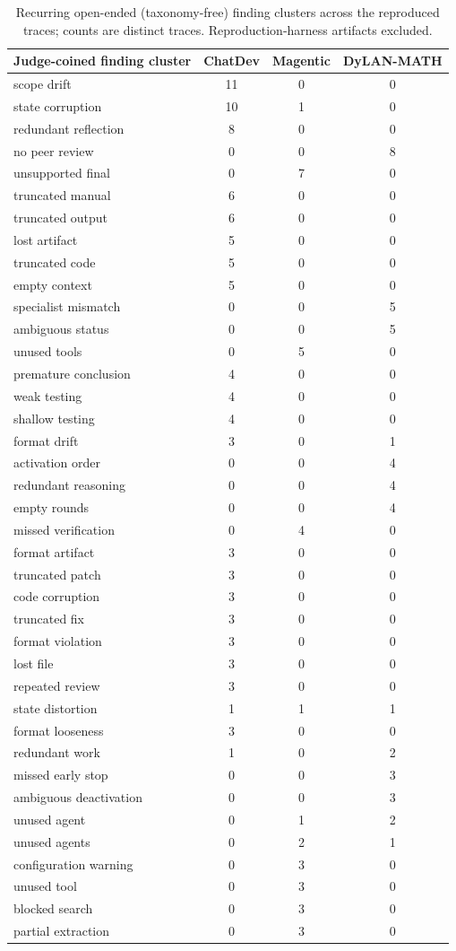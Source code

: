 \begin{table}[h]\centering\small
\begin{tabular}{lccc}\toprule
Judge-coined finding cluster & ChatDev & Magentic & DyLAN-MATH\\
\midrule
scope drift & 11 & 0 & 0\\
state corruption & 10 & 1 & 0\\
redundant reflection & 8 & 0 & 0\\
no peer review & 0 & 0 & 8\\
unsupported final & 0 & 7 & 0\\
truncated manual & 6 & 0 & 0\\
truncated output & 6 & 0 & 0\\
lost artifact & 5 & 0 & 0\\
truncated code & 5 & 0 & 0\\
empty context & 5 & 0 & 0\\
specialist mismatch & 0 & 0 & 5\\
ambiguous status & 0 & 0 & 5\\
unused tools & 0 & 5 & 0\\
premature conclusion & 4 & 0 & 0\\
weak testing & 4 & 0 & 0\\
shallow testing & 4 & 0 & 0\\
format drift & 3 & 0 & 1\\
activation order & 0 & 0 & 4\\
redundant reasoning & 0 & 0 & 4\\
empty rounds & 0 & 0 & 4\\
missed verification & 0 & 4 & 0\\
format artifact & 3 & 0 & 0\\
truncated patch & 3 & 0 & 0\\
code corruption & 3 & 0 & 0\\
truncated fix & 3 & 0 & 0\\
format violation & 3 & 0 & 0\\
lost file & 3 & 0 & 0\\
repeated review & 3 & 0 & 0\\
state distortion & 1 & 1 & 1\\
format looseness & 3 & 0 & 0\\
redundant work & 1 & 0 & 2\\
missed early stop & 0 & 0 & 3\\
ambiguous deactivation & 0 & 0 & 3\\
unused agent & 0 & 1 & 2\\
unused agents & 0 & 2 & 1\\
configuration warning & 0 & 3 & 0\\
unused tool & 0 & 3 & 0\\
blocked search & 0 & 3 & 0\\
partial extraction & 0 & 3 & 0\\
\bottomrule\end{tabular}
\caption{Recurring open-ended (taxonomy-free) finding clusters across the reproduced traces; counts are distinct traces. Reproduction-harness artifacts excluded.}\label{tab:trends}
\end{table}
